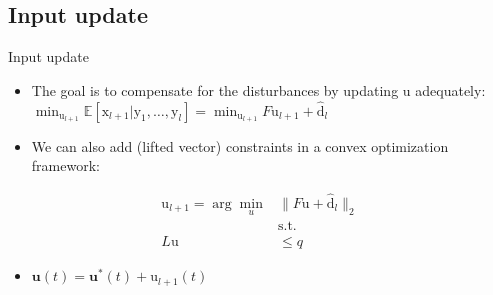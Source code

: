 \documentclass[handout]{beamer}
\newcommand{\sysInput}{\mathbf{u}} %
\newcommand{\liftedinput}{\mathrm{u}}
\newcommand{\liftedstate}{\mathrm{x}}
\newcommand{\liftedobs}{\mathrm{y}}
\newcommand{\disturbance}{\mathrm{d}}
\begin{document}
\subsection{Input update}
%
\begin{frame}{Input update}
\begin{itemize}
\item The goal is to compensate for the disturbances by updating $\liftedinput$ adequately: $\min_{\liftedinput_{l+1}} \mathbb{E}[\liftedstate_{l+1}| \liftedobs_1, \ldots, \liftedobs_l] = \min_{\liftedinput_{l+1}} F\liftedinput_{l+1} + \hat{\disturbance}_l$ \pause 
\item We can also add (lifted vector) constraints in a convex optimization framework: \pause
\end{itemize}
\begin{equation}
\begin{aligned}
\liftedinput_{l+1} = \arg\min_{u} &\|F\liftedinput + \hat{\disturbance}_l \|_{2} \\
& \text{s.t.} \\
L\liftedinput & \leq q
\end{aligned}
\end{equation}
\pause
\begin{itemize}
\item $\sysInput(t) = \sysInput^{*}(t) + \liftedinput_{l+1}(t)$
\end{itemize}
\end{frame}
%
\end{document}
